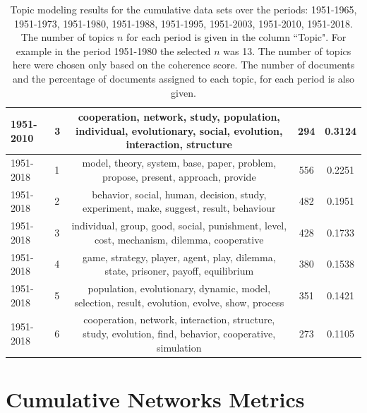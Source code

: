 \documentclass{article}
\theoremstyle{definition}
\begin{document}
\begin{table}[!hbtp]
\begin{center}
{\begin{tabular}{llccc}
             1951-2010 &               3 &  cooperation, network, study, population, individual, evolutionary, social, evolution, interaction, structure &              294 &                  0.3124 \\
             \midrule
             1951-2018 &               1 &                              model, theory, system, base, paper, problem, propose, present, approach, provide &              556 &                  0.2251 \\
             1951-2018 &               2 &                        behavior, social, human, decision, study, experiment, make, suggest, result, behaviour &              482 &                  0.1951 \\
             1951-2018 &               3 &                     individual, group, good, social, punishment, level, cost, mechanism, dilemma, cooperative &              428 &                  0.1733 \\
             1951-2018 &               4 &                            game, strategy, player, agent, play, dilemma, state, prisoner, payoff, equilibrium &              380 &                  0.1538 \\
             1951-2018 &               5 &                 population, evolutionary, dynamic, model, selection, result, evolution, evolve, show, process &              351 &                  0.1421 \\
             1951-2018 &               6 &       cooperation, network, interaction, structure, study, evolution, find, behavior, cooperative, simulation &              273 &                  0.1105 \\
            \bottomrule
            \end{tabular}            
    }
    \end{center}
    \caption{Topic modeling results for the cumulative data sets over the
    periods: 1951-1965, 1951-1973, 1951-1980, 1951-1988, 1951-1995, 1951-2003, 1951-2010,
    1951-2018. The number of topics \(n\) for each period is given in the column
    ``Topic". For example in the period 1951-1980 the selected \(n\) was 13. The
    number of topics here were chosen only based on the coherence score.
    The number of documents and the percentage of documents assigned to each
    topic, for each period is also given.}\label{table:topics_per_year}
\end{table}

\section{Cumulative Networks Metrics}\label{appendix:tables}
\end{document}
